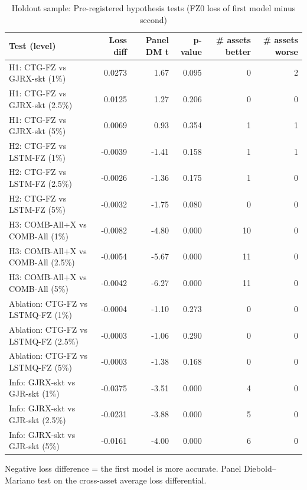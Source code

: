 \begin{table}[htbp]
\centering
\footnotesize
\caption{Holdout sample: Pre-registered hypothesis tests (FZ0 loss of first model minus second)}
\label{tab:ho_hyp}
\begin{tabular}{lrrrrr}
\toprule
Test (level) & Loss diff & Panel DM t & p-value & \# assets better & \# assets worse \\
\midrule
H1: CTG-FZ vs GJRX-skt (1\%) & 0.0273 & 1.67 & 0.095 & 0 & 2 \\
H1: CTG-FZ vs GJRX-skt (2.5\%) & 0.0125 & 1.27 & 0.206 & 0 & 0 \\
H1: CTG-FZ vs GJRX-skt (5\%) & 0.0069 & 0.93 & 0.354 & 1 & 1 \\
H2: CTG-FZ vs LSTM-FZ (1\%) & -0.0039 & -1.41 & 0.158 & 1 & 1 \\
H2: CTG-FZ vs LSTM-FZ (2.5\%) & -0.0026 & -1.36 & 0.175 & 1 & 0 \\
H2: CTG-FZ vs LSTM-FZ (5\%) & -0.0032 & -1.75 & 0.080 & 0 & 0 \\
H3: COMB-All+X vs COMB-All (1\%) & -0.0082 & -4.80 & 0.000 & 10 & 0 \\
H3: COMB-All+X vs COMB-All (2.5\%) & -0.0054 & -5.67 & 0.000 & 11 & 0 \\
H3: COMB-All+X vs COMB-All (5\%) & -0.0042 & -6.27 & 0.000 & 11 & 0 \\
Ablation: CTG-FZ vs LSTMQ-FZ (1\%) & -0.0004 & -1.10 & 0.273 & 0 & 0 \\
Ablation: CTG-FZ vs LSTMQ-FZ (2.5\%) & -0.0003 & -1.06 & 0.290 & 0 & 0 \\
Ablation: CTG-FZ vs LSTMQ-FZ (5\%) & -0.0003 & -1.38 & 0.168 & 0 & 0 \\
Info: GJRX-skt vs GJR-skt (1\%) & -0.0375 & -3.51 & 0.000 & 4 & 0 \\
Info: GJRX-skt vs GJR-skt (2.5\%) & -0.0231 & -3.88 & 0.000 & 5 & 0 \\
Info: GJRX-skt vs GJR-skt (5\%) & -0.0161 & -4.00 & 0.000 & 6 & 0 \\
\bottomrule
\end{tabular}
\par\smallskip\parbox{\linewidth}{\scriptsize Negative loss difference = the first model is more accurate. Panel Diebold--Mariano test on the cross-asset average loss differential.}
\end{table}